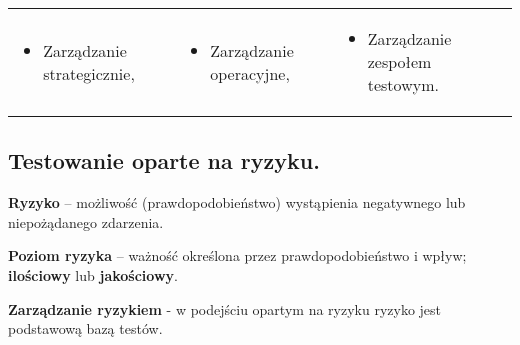\documentclass[../main.tex]{subfiles}
\begin{document}
    \begin{table}[H]
        \begin{center}
            \begin{tabular}{p{5cm}  p{} p{7cm}}
                \begin{itemize}
                    \item Zarządzanie strategicznie,
                \end{itemize}
                &
                \begin{itemize}
                    \item Zarządzanie operacyjne,
                \end{itemize}
                &
                \begin{itemize}
                    \item Zarządzanie zespołem testowym.
                \end{itemize}
            \end{tabular}
        \end{center}
    \end{table}

    \subsection{Testowanie oparte na ryzyku.}

    \textbf{Ryzyko} – możliwość (prawdopodobieństwo) wystąpienia negatywnego lub niepożądanego zdarzenia.

    \textbf{Poziom ryzyka} – ważność określona przez prawdopodobieństwo i wpływ; \textbf{ilościowy} lub
    \textbf{jakościowy}.

    \textbf{Zarządzanie ryzykiem} - w podejściu opartym na ryzyku ryzyko jest podstawową bazą testów.
\end{document}
